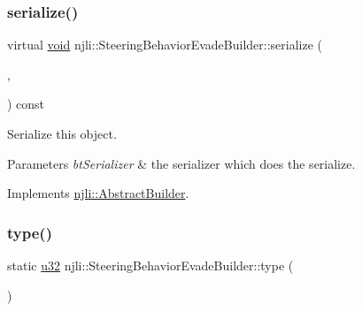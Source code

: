 \mbox{\label{classnjli_1_1_steering_behavior_evade_builder_a340a9ed97c82909286f05fdcd05b3db7}} 
\subsubsection{\texorpdfstring{serialize()}{serialize()}}
{\footnotesize\ttfamily virtual \mbox{\hyperlink{_thread_8h_af1e856da2e658414cb2456cb6f7ebc66}{void}} njli\+::\+Steering\+Behavior\+Evade\+Builder\+::serialize (\begin{DoxyParamCaption}\item[{\mbox{\hyperlink{_thread_8h_af1e856da2e658414cb2456cb6f7ebc66}{void}} $\ast$}]{,  }\item[{bt\+Serializer $\ast$}]{ }\end{DoxyParamCaption}) const\hspace{0.3cm}{\ttfamily [virtual]}}

Serialize this object.


\begin{DoxyParams}{Parameters}
{\em bt\+Serializer} & the serializer which does the serialize. \\
\hline
\end{DoxyParams}


Implements \mbox{\hyperlink{classnjli_1_1_abstract_builder_ab66b774e02ccb9da554c9aab7fa6d981}{njli\+::\+Abstract\+Builder}}.

\mbox{\label{classnjli_1_1_steering_behavior_evade_builder_a7f11e366113188486e67abecb5d1fbda}} 
\subsubsection{\texorpdfstring{type()}{type()}}
{\footnotesize\ttfamily static \mbox{\hyperlink{_util_8h_a10e94b422ef0c20dcdec20d31a1f5049}{u32}} njli\+::\+Steering\+Behavior\+Evade\+Builder\+::type (\begin{DoxyParamCaption}{ }\end{DoxyParamCaption})\hspace{0.3cm}{\ttfamily [static]}}

